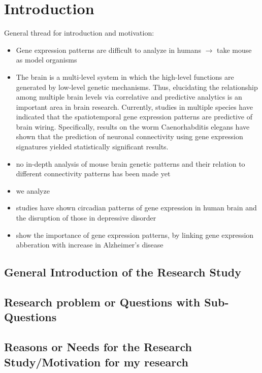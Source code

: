 \documentclass[]{article}
\renewcommand{\cite}{\citep}
\begin{document}
\section{Introduction}
\label{sec:introduction}
General thread for introduction and motivation:
\begin{itemize}
	\item Gene expression patterns are difficult to analyze in humans $\rightarrow$ take mouse as model organisms
	\item The brain is a multi-level system in which the high-level functions are generated by low-level genetic mechanisms. Thus, elucidating the relationship among multiple brain levels via correlative and predictive analytics is an important area in brain research. Currently, studies in multiple species have indicated that the spatiotemporal gene expression patterns are predictive of brain wiring. Specifically, results on the worm Caenorhabditis elegans have shown that the prediction of neuronal connectivity using gene expression signatures yielded statistically significant results.
	\item no in-depth analysis of mouse brain genetic patterns and their relation to different connectivity patterns has been made yet
	\item we analyze 
	
	\item studies have shown circadian patterns of gene expression in human brain and the disruption of those in depressive disorder \cite{li2013circadian}
	\item \cite{twine2011whole} show the importance of gene expression patterns, by linking gene expression abberation with increase in Alzheimer's disease
	
\end{itemize}

\subsection*{General Introduction of the Research Study}

\subsection*{Research problem or Questions with Sub-Questions}

\subsection*{Reasons or Needs for the Research Study/Motivation for my research}
\end{document}
